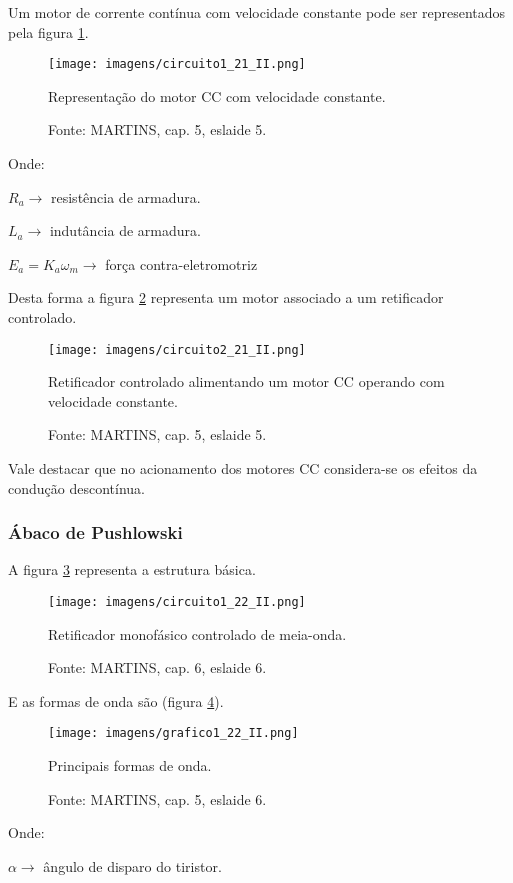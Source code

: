Um motor de corrente contínua com velocidade constante pode ser representados pela figura \ref{fig:C1-21-II}.

\begin{figure}[ht!]
\center
\texttt{[image: imagens/circuito1\_21\_II.png]}
\caption{\label{fig:C1-21-II}Representação do motor CC com velocidade constante.}
\caption*{Fonte: MARTINS, cap. 5, eslaide 5.}
\end{figure}

Onde:

$R_{a} \rightarrow$ resistência de armadura.

$L_{a} \rightarrow$ indutância  de armadura.

$E_{a} = K_{a}\omega_{m} \rightarrow$ força contra-eletromotriz

Desta forma a figura \ref{fig:C2-21-II} representa um motor associado a um retificador controlado.

\begin{figure}[ht!]
\center
\texttt{[image: imagens/circuito2\_21\_II.png]}
\caption{\label{fig:C2-21-II} Retificador controlado alimentando um motor CC operando com velocidade constante.}
\caption*{Fonte: MARTINS, cap. 5, eslaide 5.}
\end{figure}

Vale destacar que no acionamento dos motores CC considera-se os efeitos da condução descontínua.

\subsubsection{Ábaco de Pushlowski}
A figura \ref{fig:C1-22-II} representa a estrutura básica.

\begin{figure}[ht!]
\center
\texttt{[image: imagens/circuito1\_22\_II.png]}
\caption{\label{fig:C1-22-II} Retificador monofásico controlado de meia-onda.}
\caption*{Fonte: MARTINS, cap. 6, eslaide 6.}
\end{figure}

E as formas de onda são (figura \ref{fig:G1-22-II}).

\begin{figure}[ht!]
\center
\texttt{[image: imagens/grafico1\_22\_II.png]}
\caption{\label{fig:G1-22-II} Principais formas de onda.}
\caption*{Fonte: MARTINS, cap. 5, eslaide 6.}
\end{figure}

Onde:

$\alpha \rightarrow$ ângulo de disparo do tiristor.

